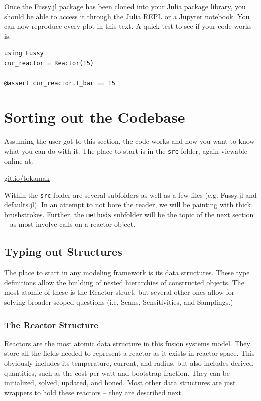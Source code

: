 Once the Fussy.jl package has been cloned into your Julia package library, you should be able to access it through the Julia REPL or a Jupyter notebook. You can now reproduce every plot in this text. A quick test to see if your code works is: \\

\begin{addmargin}[1.5em]{1.5em}
\texttt{using Fussy \\
cur\_reactor = Reactor(15) \\ \\
@assert cur\_reactor.T\_bar == 15
}
\end{addmargin}

\section{Sorting out the Codebase}

Assuming the user got to this section, the code works and now you want to know what you can do with it. The place to start is in the \texttt{src} folder, again viewable online at:

{\centering \href{http://git.io/tokamak}{git.io/tokamak} \par }

Within the \texttt{src} folder are several subfolders as well as a few files (e.g. Fussy.jl and defaults.jl). In an attempt to not bore the reader, we will be painting with thick brushstrokes. Further, the \texttt{methods} subfolder will be the topic of the next section -- as most involve calls on a reactor object.

\subsection{Typing out Structures}

The place to start in any modeling framework is its data structures. These type definitions allow the building of nested hierarchies of constructed objects. The most atomic of these is the Reactor struct, but several other ones allow for solving broader scoped questions (i.e. Scans, Sensitivities, and Samplings.)

\subsubsection{The Reactor Structure}

Reactors are the most atomic data structure in this fusion systems model. They store all the fields needed to represent a reactor as it exists in reactor space. This obviously includes its temperature, current, and radius, but also includes derived quantities, such as the cost-per-watt and bootstrap fraction. They can be initialized, solved, updated, and honed. Most other data structures are just wrappers to hold these reactors -- they are described next.

